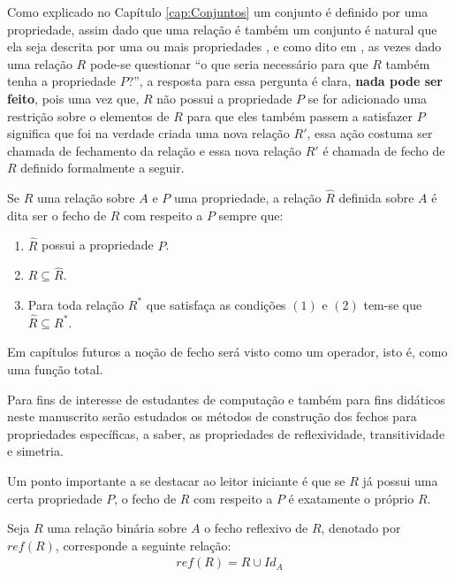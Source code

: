 Como explicado no Capítulo \ref{cap:Conjuntos} um conjunto é definido por uma propriedade, assim dado que uma relação é também um conjunto é natural que ela seja descrita por uma ou mais propriedades , e como dito em \cite{judith2021}, as vezes dado uma relação $R$ pode-se questionar ``o que seria necessário para que  $R$ também tenha a propriedade  $P$?'', a resposta para essa pergunta é clara, \textbf{nada pode ser feito}, pois uma vez que, $R$ não possui a propriedade $P$ se for adicionado uma restrição sobre o elementos de $R$ para que eles também passem a satisfazer $P$ significa que foi na verdade criada uma nova relação $R'$, essa ação costuma ser chamada de fechamento da relação e essa nova relação $R'$ é chamada de fecho de $R$ definido formalmente a seguir.

\begin{definition}
	Se $R$ uma relação sobre $A$ e $P$ uma propriedade, a relação $\widehat{R}$ definida sobre $A$ é dita ser o fecho de $R$ com respeito a $P$ sempre que:
	\begin{enumerate}
		\item $\widehat{R}$ possui a propriedade $P$.
		\item $R \subseteq \widehat{R}$.
		\item Para toda relação $R^*$ que satisfaça as condições $(1)$ e $(2)$ tem-se que $\widehat{R} \subseteq R^*$. 
	\end{enumerate}
\end{definition}

\begin{remark}
	Em capítulos futuros a noção de fecho será visto como um operador, isto é, como uma função total.
\end{remark}

Para fins de interesse de estudantes de computação e também para fins didáticos neste manuscrito serão estudados os métodos de construção dos fechos para propriedades específicas, a saber, as propriedades de reflexividade, transitividade e simetria.

Um ponto importante a se destacar ao leitor iniciante é que se $R$ já possui uma certa propriedade $P$, o fecho de $R$ com respeito a $P$ é exatamente o próprio $R$.

\begin{definition}\label{def:FechoReflexivo}
	Seja $R$ uma relação binária sobre $A$ o fecho reflexivo de $R$, denotado por $ref(R)$, corresponde a seguinte relação:
	\begin{eqnarray*}
		ref(R) = R \cup Id_A
	\end{eqnarray*}
\end{definition}

